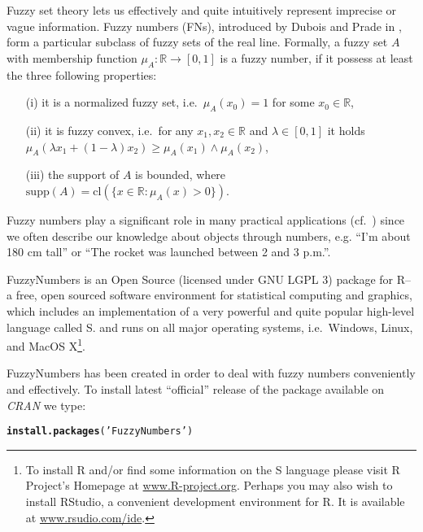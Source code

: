 \documentclass[11pt]{article}\usepackage{graphicx, color}
\makeatletter
\newcommand{\hlfunctioncall}[1]{\textcolor[rgb]{0.501960784313725,0,0.329411764705882}{\textbf{#1}}}%
\newcommand{\hlstring}[1]{\textcolor[rgb]{0.6,0.6,1}{#1}}%
\newenvironment{kframe}{%
 \def\at@end@of@kframe{}%
 \ifinner\ifhmode%
  \def\at@end@of@kframe{\end{minipage}}%
  \begin{minipage}{\columnwidth}%
 \fi\fi%
 \def\FrameCommand##1{\hskip\@totalleftmargin \hskip-\fboxsep
 \colorbox{shadecolor}{##1}\hskip-\fboxsep
     \hskip-\linewidth \hskip-\@totalleftmargin \hskip\columnwidth}%
 \MakeFramed {\advance\hsize-\width
   \@totalleftmargin\z@ \linewidth\hsize
   \@setminipage}}%
 {\par\unskip\endMakeFramed%
 \at@end@of@kframe}
\newenvironment{knitrout}{}{} %
\newcommand{\package}[1]{\textsf{#1}\xspace}
\newcommand{\program}[1]{\textsf{#1}\xspace}
\newcommand{\os}[1]{\textsf{#1}\xspace}
\newcommand{\lang}[1]{\textsf{#1}\xspace}
\newcommand{\R}{\lang{R}}
\makeatother
\begin{document}
Fuzzy set theory lets us effectively and quite intuitively represent
imprecise or vague information. Fuzzy numbers (FNs), introduced
by Dubois and Prade in \cite{DuboisPrade1978}, form a particular
subclass of fuzzy sets of the real line.
Formally, a fuzzy set $A$
with membership function $\mu_A:\mathbb{R}\to[0,1]$
is a fuzzy number, if it possess at least the three following properties:
\begin{itemize}
\item[(i)] it is a normalized fuzzy set,
i.e.~$\mu_A(x_0)=1$ for some $x_0\in\mathbb{R}$,
\item[(ii)] it is fuzzy convex, i.e.~for any $x_1,x_2\in\mathbb{R}$
and $\lambda\in[0,1]$ it holds
$\mu_A(\lambda x_1 + (1-\lambda) x_2) \ge \mu_A(x_1)\wedge \mu_A(x_2)$,
\item[(iii)] the support of $A$ is bounded,
where $\mathrm{supp}(A) = \mathrm{cl}(\{x\in\mathbb{R}: \mu_A(x)>0\})$.
\end{itemize}
Fuzzy numbers play a significant role
in many practical applications
(cf.~\cite{KlirYuan1995:fuzzybook})
since we often describe our knowledge about objects
through numbers, e.g. ``I'm about 180 cm tall''
or ``The rocket was launched between 2 and 3 p.m.''.




\bigskip
\package{FuzzyNumbers} is an Open Source (licensed under GNU LGPL 3)
package for \R -- a free, open sourced software environment
for statistical computing and graphics, which
includes an implementation
of a very powerful and quite popular high-level language called \lang{S}.
and runs on all major operating systems, i.e.~\os{Windows},
\os{Linux}, and \os{MacOS X}\footnote{%
To install \R and/or find some information on the \lang{S} language
please visit \R Project's Homepage at \href{http://www.R-project.org}{www.R-project.org}.
Perhaps you may also wish to install  \program{RStudio},
a convenient development environment for \R.
It is available at \href{http://www.rstudio.com/ide/}{www.rsudio.com/ide}.}.


\package{FuzzyNumbers} has been created in order to deal with fuzzy numbers
conveniently and effectively.
To install latest ``official'' release of the 
package available on \textit{CRAN} we type:

\begin{knitrout}\small
{}\color{fgcolor}\begin{kframe}
\begin{alltt}
\hlfunctioncall{install.packages}(\hlstring{'FuzzyNumbers'})
\end{alltt}
\end{kframe}
\end{knitrout}
\end{document}
